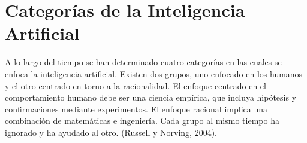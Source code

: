 \section{Categorías de la Inteligencia Artificial} %

A lo largo del tiempo se han determinado cuatro categorías en las cuales se enfoca la inteligencia artificial. Existen dos grupos, uno enfocado en los humanos y el otro centrado en torno a la racionalidad. 
El enfoque centrado en el comportamiento humano debe ser una ciencia empírica, que incluya hipótesis y confirmaciones mediante experimentos. El enfoque racional implica una combinación de matemáticas e ingeniería. Cada grupo al mismo tiempo ha ignorado y ha ayudado al otro. (Russell y Norving, 2004).

